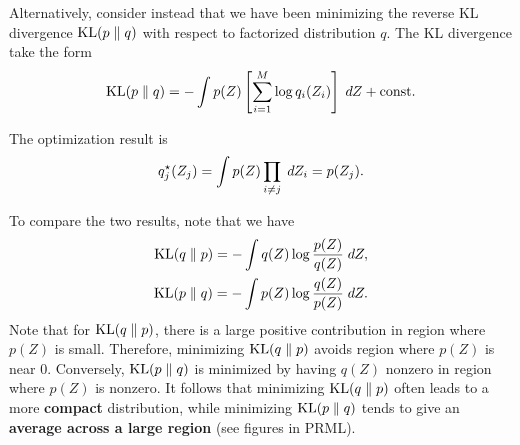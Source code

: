 \documentclass[a4paper]{article}
\begin{document}
Alternatively, consider instead that we have been minimizing 
the reverse KL divergence $\mathrm{KL}(p \; \Vert \; q)$ with respect to 
factorized distribution $q$. The KL divergence
take the form 
\[
\mathrm{KL}(p \; \Vert \; q) = - \int p(Z) \left[ \sum_{i=1}^M \log q_i 
(Z_i) \right] \; d Z + \mathrm{const}.
\]


The optimization result is 
\[
q_j^\star (Z_j) = \int p(Z) \prod_{i \neq j} \; d Z_i = p(Z_j).
\]

To compare the two results, note that we have 
\[
\begin{aligned}
\mathrm{KL}(q \; \Vert \; p) = - \int q(Z) \log \frac{p(Z)}{q(Z)} \; d Z, \\
\mathrm{KL}(p \; \Vert \; q) = - \int p(Z) \log \frac{q(Z)}{p(Z)} \; d Z.
\end{aligned}
\]
Note that for $\mathrm{KL}(q \; \Vert \; p)$, there is a large positive 
contribution in region where $p(Z)$ is small.
Therefore, minimizing $\mathrm{KL}(q \; \Vert \; p)$ avoids region 
where $p(Z)$ is near $0$. Conversely, 
$\mathrm{KL}(p \; \Vert \; q)$ is minimized by having $q(Z)$ nonzero 
in region where $p(Z)$ is nonzero. It follows that 
minimizing $\mathrm{KL}(q \; \Vert \; p)$ often leads to a more \textbf{compact} 
distribution, while minimizing $\mathrm{KL}(p \; \Vert \; q)$ tends 
to give an \textbf{average across a large region}
(see figures in PRML).
\end{document}
